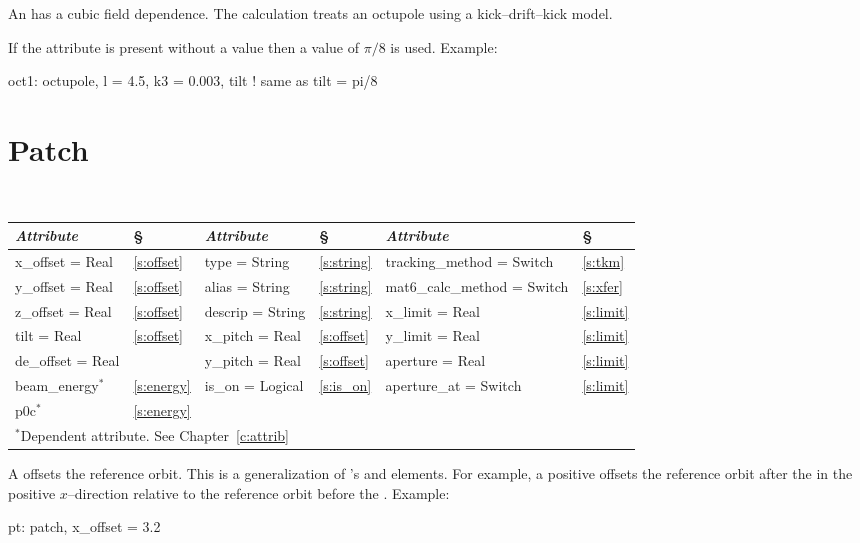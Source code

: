 {{An  has a cubic field dependence.
The  calculation treats an octupole using a kick--drift--kick model.

If the  attribute is present without a value then a value of 
$\pi/8$ is used.
Example:
\begin{example}
  oct1: octupole, l = 4.5, k3 = 0.003, tilt ! same as tilt = pi/8
\end{example}

\section{Patch}
\label{s:patch}

\begin{center}
\tt
\begin{tabular}{|l|l||l|l||l|l|} \hline
  {\sl Attribute} & \S  & {\sl Attribute} & \S & {\sl Attribute} & \S \\ \hline
  x\_offset  = Real  & \ref{s:offset} &  type = String      & \ref{s:string} & tracking\_method = Switch   & \ref{s:tkm}   \\ \hline
  y\_offset  = Real  & \ref{s:offset} &  alias = String     & \ref{s:string} & mat6\_calc\_method = Switch & \ref{s:xfer}  \\ \hline
  z\_offset  = Real  & \ref{s:offset} &  descrip = String   & \ref{s:string} & x\_limit = Real             & \ref{s:limit} \\ \hline
  tilt = Real        & \ref{s:offset} &  x\_pitch   = Real  & \ref{s:offset} & y\_limit = Real             & \ref{s:limit} \\ \hline
  de\_offset = Real  &                &  y\_pitch   = Real  & \ref{s:offset} & aperture = Real             & \ref{s:limit} \\ \hline
  beam\_energy$^*$   & \ref{s:energy} &  is\_on = Logical   & \ref{s:is_on}  & aperture\_at = Switch       & \ref{s:limit} \\ \hline
  p0c$^*$            & \ref{s:energy} &                     &                &                             &               \\ \hline
  \multicolumn{6}{l}{\small $^*$Dependent attribute. See Chapter~\ref{c:attrib}} \\
\end{tabular}
\end{center}
\toffset

A  offsets the reference orbit. This is a generalization of
\mad's  and  elements. For example, a positive
 offsets the reference orbit after the  in the
positive $x$--direction relative to the reference orbit before the
.
Example:
\begin{example}
  pt: patch, x\_offset = 3.2
\end{example}

}}
